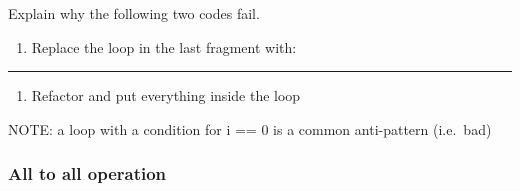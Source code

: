 Explain why the following two codes fail.

\begin{enumerate}
\def\labelenumi{\arabic{enumi}.}
\itemsep1pt\parskip0pt
\item
  Replace the loop in the last fragment with:
\end{enumerate}

\begin{Shaded}
\begin{Highlighting}[]
 \NormalTok{(} 
\end{Highlighting}
\end{Shaded}

\begin{center}\rule{3in}{0.4pt}\end{center}

\begin{enumerate}
\def\labelenumi{\arabic{enumi}.}
\setcounter{enumi}{1}
\itemsep1pt\parskip0pt
\item
  Refactor and put everything inside the loop
\end{enumerate}

\begin{Shaded}
\begin{Highlighting}[]
 \NormalTok{;}
 \NormalTok{(} 
      \NormalTok{) \{ } \NormalTok{\}}
       \NormalTok{\}}
      \NormalTok{\}}
\NormalTok{\}}
\end{Highlighting}
\end{Shaded}

NOTE: a loop with a condition for i == 0 is a common anti-pattern
(i.e.~bad)

\subsubsection{All to all operation}\label{all-to-all-operation}

\begin{Shaded}
\begin{Highlighting}[]
    
                  
\end{Highlighting}
\end{Shaded}

